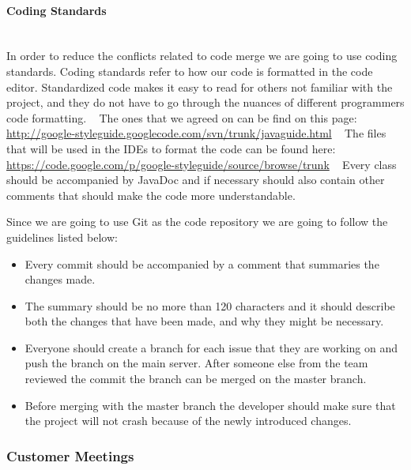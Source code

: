 \documentclass[../document.tex]{subfiles}
\begin{document}
\paragraph{Coding Standards} \ \\
In order to reduce the conflicts related to code merge we are going to use coding standards. Coding standards refer to how our code is formatted in the code editor. Standardized code makes it easy to read for others not familiar with the project, and they do not have to go through the nuances of different programmers code formatting.
\newline \ \newline
The ones that we agreed on can be find on this page: \newline
\url{http://google-styleguide.googlecode.com/svn/trunk/javaguide.html}
\newline \ \newline
The files that will be used in the IDEs to format the code can be found here: \newline
\url{https://code.google.com/p/google-styleguide/source/browse/trunk}
\newline \ \newline
Every class should be accompanied by JavaDoc and if necessary should also contain other comments that should make the code more understandable. 

Since we are going to use Git as the code repository we are going to follow the guidelines listed below:
\begin{itemize}
\item
Every commit should be accompanied by a comment that summaries the changes made. 
\item
The summary should be no more than 120 characters and it should describe both the changes that have been made, and why they might be necessary.
\item
Everyone should create a branch for each issue that they are working on and push the branch on the main server. After someone else from the team reviewed the commit the branch can be merged on the master branch.
\item
Before merging with the master branch the developer should make sure that the project will not crash because of the newly introduced changes.
\end{itemize}

\subsubsection{Customer Meetings}
\end{document}

